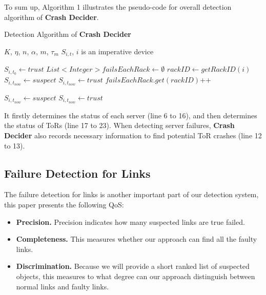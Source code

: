 \documentclass{sig-alternate-05-2015}
\begin{document}
To sum up, Algorithm 1 illustrates the pseudo-code for overall detection algorithm of \textbf{Crash Decider}.
\renewcommand{\algorithmicrequire}{\textbf{Input:}}
\renewcommand{\algorithmicensure}{\textbf{Output:}}
\begin{algorithm}
	\caption{Detection Algorithm of \textbf{Crash Decider}}
	\begin{algorithmic}[1]
		\REQUIRE $K$, $\eta$, $n$, $\alpha$, $m$, $\tau_m$
		\ENSURE $S_{i,t}$, $i$ is an imperative device
	
            \STATE $S_{i,t_0} \leftarrow trust$
        \ENDFOR
            \STATE $List<Integer> failsEachRack \leftarrow \emptyset$
                \STATE $rackID \leftarrow getRackID(i)$
                    \STATE $S_{i,t_{now}} \leftarrow suspect$
                \ELSE
                    \STATE $S_{i,t_{now}} \leftarrow trust$
                    \STATE $failsEachRack.get(rackID)\text{++}$
                    \ENDIF
                \ENDIF
            \ENDFOR

                    \STATE $S_{i,t_{now}} \leftarrow suspect$
                \ELSE
                    \STATE $S_{i,t_{now}} \leftarrow trust$
                \ENDIF
            \ENDFOR
		\ENDWHILE
	\end{algorithmic}
\end{algorithm}
It firstly determines the status of each server (line 6 to 16), and then determines the status of ToRs (line 17 to 23). When detecting server failures, \textbf{Crash Decider} also records necessary information to find potential ToR crashes (line 12 to 13).

\subsection{Failure Detection for Links}
The failure detection for links is another important part of our detection system, this paper presents the following QoS:
\begin{itemize}
  \item \textbf{Precision.} Precision indicates how many suspected links are true failed.
  \item \textbf{Completeness.} This measures whether our approach can find all the faulty links.
  \item \textbf{Discrimination.} Because we will provide a short ranked list of suspected objects, this measures to what degree can our approach distinguish between normal links and faulty links.
\end{itemize}
\end{document}
